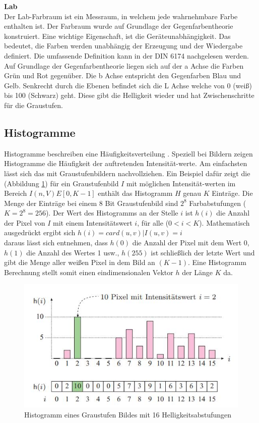 \documentclass[a4paper,12pt,oneside]{article}
\begin{document}
  \textbf{Lab}\label{s.lab}\\
  Der Lab-Farbraum ist ein Messraum, in welchem jede wahrnehmbare Farbe enthalten ist. Der Farbraum wurde auf Grundlage der Gegenfarbentheorie konstruiert. Eine wichtige Eigenschaft, ist die Geräteunabhängigkeit. Das bedeutet, die Farben werden unabhängig der Erzeugung und der Wiedergabe definiert. Die umfassende Definition kann in der DIN 6174 nachgelesen werden. Auf Grundlage der Gegenfarbentheorie liegen sich auf der a Achse die Farben Grün und Rot gegenüber. Die b Achse entspricht den Gegenfarben Blau und Gelb. Senkrecht durch die Ebenen befindet sich die L Achse welche von 0 (weiß) bis 100 (Schwarz) geht. Diese gibt die Helligkeit wieder und hat Zwischenschritte für die Graustufen.
\newpage
\subsection{Histogramme}\label{s.histogramme}
Histogramme beschreiben eine Häufigkeitsverteilung \cite[42ff.]{burger2009digitale}. Speziell bei Bildern zeigen Histogramme die Häufigkeit der auftretenden Intensität-werte. Am einfachsten lässt sich das mit Graustufenbildern nachvollziehen. Ein Beispiel dafür zeigt die (Abbildung \ref{img:histogramm}) für ein Graustufenbild $I$ mit möglichen Intensität-werten im Bereich $I(n,V)E[0,K-1]$ enthält das Histogramm $H$ genau $K$ Einträge. Die Menge der Einträge bei einem 8 Bit Graustufenbild sind $2^8$ Farbabstufungen ($K=2^8=256$). Der Wert des Histogramms an der Stelle $i$ ist $h(i)$ die Anzahl der Pixel von $I$ mit einem Intensitätswert $i$, für alle ($0<i<K$). Mathematisch ausgedrückt ergibt sich $h(i)=card{(u,v) | I(u,v)=i}$\\
  daraus lässt sich entnehmen, dass $h(0)$ die Anzahl der Pixel mit dem Wert 0, $h(1)$ die Anzahl des Wertes 1 usw., $h(255)$ ist schließlich der letzte Wert und gibt die Menge aller weißen Pixel in dem Bild an $(K-1)$. Eine Histogramm Berechnung stellt somit einen eindimensionalen Vektor $h$ der Länge $K$ da.\\
  \begin{figure}
    [h]
    \centering
    \includegraphics[scale=1.0]{Sources/histogramm.jpg}
    \caption{Histogramm eines Graustufen Bildes mit 16 Helligkeitsabstufungen \cite[42]{burger2009digitale}}
    \label{img:histogramm}
  \end{figure}
\end{document}
